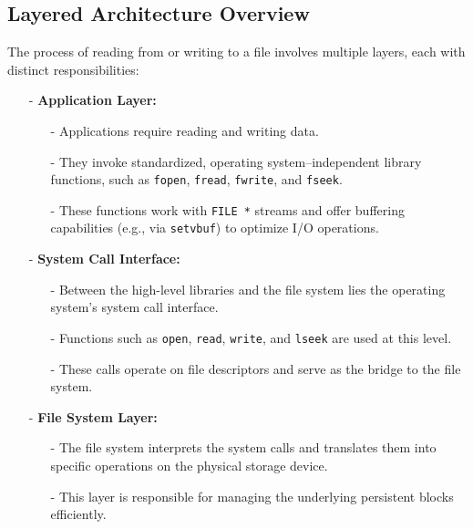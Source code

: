 \documentclass[../../compsys.tex]{subfiles}
\begin{document}
\subsection{Layered Architecture Overview}
The process of reading from or writing to a file involves multiple layers, each with distinct responsibilities:\\[10px]
\noindent
\begin{minipage}{0.55\textwidth}
\begin{itemize}
    \item[-] \textbf{Application Layer:}
    \begin{itemize}
        \item[-] Applications require reading and writing data.
        \item[-] They invoke standardized, operating system–independent library functions, such as \verb|fopen|, \verb|fread|, \verb|fwrite|, and \verb|fseek|.
        \item[-] These functions work with \verb|FILE *| streams and offer buffering capabilities (e.g., via \verb|setvbuf|) to optimize I/O operations.
    \end{itemize}

    \item[-] \textbf{System Call Interface:}
    \begin{itemize}
        \item[-] Between the high-level libraries and the file system lies the operating system's system call interface.
        \item[-] Functions such as \verb|open|, \verb|read|, \verb|write|, and \verb|lseek| are used at this level.
        \item[-] These calls operate on file descriptors and serve as the bridge to the file system.
    \end{itemize}

    \item[-] \textbf{File System Layer:}
    \begin{itemize}
        \item[-] The file system interprets the system calls and translates them into specific operations on the physical storage device.
        \item[-] This layer is responsible for managing the underlying persistent blocks efficiently.
    \end{itemize}
\end{itemize}
\end{minipage}
\hfill
\end{document}
